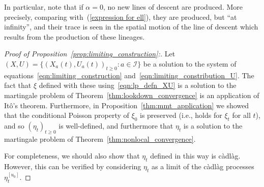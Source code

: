 \documentclass[EJP]{ejpecp} %
\newcommand{\lp}{\xi}              %
\newcommand{\labelspace}{\mathcal{I}} %
\begin{document}
In particular, note that if $\alpha=0$,
no new lines of descent are produced.
More precisely, comparing with~(\ref{expression for ell}),
they are produced, but ``at infinity'',
and their trace is seen in the 
spatial motion of the line of descent which results from
the production of these lineages.

\begin{proof}[Proof of Proposition~\ref{prop:limiting_construction}:]
    Let $(X, U) = \{(X_a(t), U_a(t))_{t \ge 0}: a \in \labelspace \}$ 
    be a solution to the system of equations~\eqref{eqn:limiting_construction}
    and~\eqref{eqn:limiting_constribution_U}.
    The fact that $\lp$ defined with these using~\eqref{eqn:lp_defn_XU}
    is a solution to the martingale problem of Theorem~\ref{thm:lookdown_convergence}
    is an application of It\^o's theorem.
    Furthermore, in Proposition~\ref{thm:mmt_application} we showed that
    the conditional Poisson property of $\lp_0$ is preserved
    (i.e., holds for $\lp_t$ for all $t$), and so
    $(\eta_t)_{t \ge 0}$ is well-defined,
    and furthermore that $\eta_t$ is a solution
    to the martingale problem of Theorem~\ref{thm:nonlocal_convergence}.

    For completeness, we should also show that $\eta_t$ defined in this way is c\`adl\`ag.
    However, this can be verified by 
    considering $\eta_t$ as a limit of the c\`adl\`ag processes $\eta^{[u_0]}_t$.
\end{proof}
\end{document}
